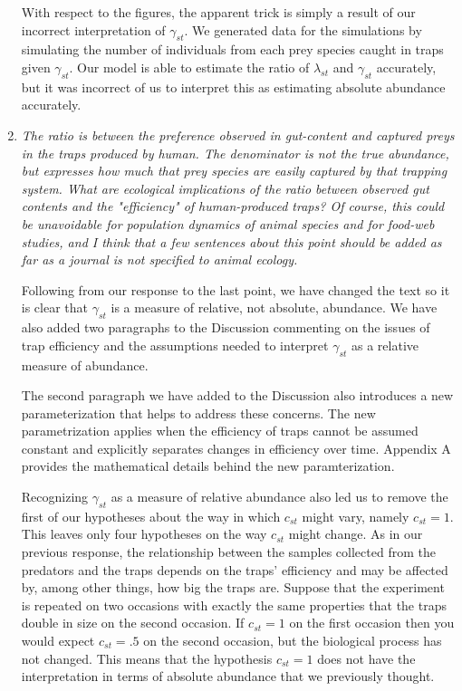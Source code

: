 \documentclass[12pt]{article}
\begin{document}
\begin{enumerate}
With respect to the figures, the apparent trick is simply a result of our incorrect interpretation of $\gamma_{st}$. We generated data for the simulations by simulating the number of individuals from each prey species caught in traps given $\gamma_{st}$. Our model is able to estimate the ratio of $\lambda_{st}$ and $\gamma_{st}$ accurately, but it was incorrect of us to interpret this as estimating absolute abundance accurately. 

\item \textit{ The ratio is between the preference observed in gut-content and captured preys in the traps produced by human. The denominator is not the true abundance, but expresses how much that prey species are easily captured by that trapping system. What are ecological implications of the ratio between observed gut contents and the "efficiency" of human-produced traps? Of course, this could be unavoidable for population dynamics of animal species and for food-web studies, and I think that a few sentences about this point should be added as far as a journal is not specified to animal ecology.}

Following from our response to the last point, we have changed the text so it is clear that $\gamma_{st}$ is a measure of relative, not absolute, abundance. We have also added two paragraphs to the Discussion commenting on the issues of trap efficiency and the assumptions needed to interpret $\gamma_{st}$ as a relative measure of abundance.  

The second paragraph we have added to the Discussion also introduces a new parameterization that helps to address these concerns. The new parametrization applies when the efficiency of traps cannot be assumed constant and explicitly separates changes in efficiency over time. Appendix A provides the mathematical details behind the new paramterization.

Recognizing $\gamma_{st}$ as a measure of relative abundance also led us to remove the first of our hypotheses about the way in which $c_{st}$ might vary, namely $c_{st} = 1$. This leaves only four hypotheses on the way $c_{st}$ might change. As in our previous response, the relationship between the samples collected from the predators and the traps depends on the traps' efficiency and may be affected by, among other things, how big the traps are.  Suppose that the experiment is repeated on two occasions with exactly the same properties that the traps double in size on the second occasion.  If $c_{st}=1$ on the first occasion then you would expect $c_{st}=.5$ on the second occasion, but the biological process has not changed.  This means that the hypothesis $c_{st} = 1$ does not have the interpretation in terms of absolute abundance that we previously thought. 

\end{enumerate}
\end{document}
